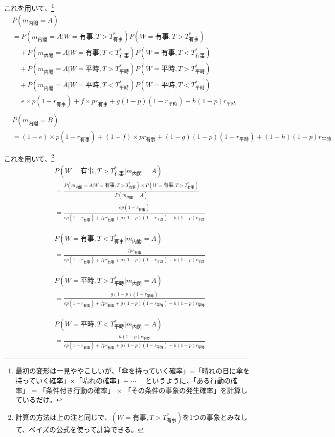 \documentclass[main.tex]{subfiles}
\begin{document}
これを用いて、\footnote{最初の変形は一見ややこしいが、「傘を持っていく確率」=「晴れの日に傘を持っていく確率」×「晴れの確率」+ $\cdots \quad$ 
というように、「ある行動の確率」 = 「条件付き行動の確率」 × 「その条件の事象の発生確率」を計算しているだけ。}
\begin{align*}
    & P(m_{内閣} = A) \\
    &=  P(m_{内閣} = A | W=有事, T>T^*_{有事})P(W=有事, T>T^*_{有事}) \\
    &\quad + P(m_{内閣} = A | W=有事, T<T^*_{有事})P(W=有事, T<T^*_{有事})\\
    &\quad + P(m_{内閣} = A | W=平時, T>T^*_{平時})P(W=平時, T>T^*_{平時})\\
    &\quad + P(m_{内閣} = A | W=平時, T<T^*_{平時})P(W=平時, T<T^*_{平時})\\
    &= e × p(1-r_{有事}) + f× pr_{有事} + g(1-p)(1-r_{平時}) + h(1-p)r_{平時}\\
    \\
    & P(m_{内閣} = B) \\
    &= (1-e) × p(1-r_{有事}) + (1-f)× pr_{有事} + (1-g)(1-p)(1-r_{平時}) + (1-h)(1-p)r_{平時}
\end{align*}

これを用いて、\footnote{計算の方法は上の注と同じで、$(W=有事, T>T^*_{有事})$を1つの事象とみなして、ベイズの公式を使って計算できる。}
\begin{align*}
    & P(W=有事, T>T^*_{有事} | m_{内閣}=A)\\[0.5em]
    &= \frac{ P(m_{内閣}=A| W={有事}, T>T^*_{有事}) × P(W={有事}, T>T^*_{有事}) }{ P(m_{内閣}=A) } \\[1em]
    &= \frac{ ep(1-r_{有事}) }{ ep(1-r_{有事}) + fpr_{有事} + g(1-p)(1-r_{平時}) + h(1-p)r_{平時} }
\end{align*}

\begin{align*}
    & P(W=有事, T<T^*_{有事} | m_{内閣}=A)\\[0.5em]
    &= \frac{ fpr_{有事} }{ ep(1-r_{有事}) + fpr_{有事} + g(1-p)(1-r_{平時}) + h(1-p)r_{平時} }
\end{align*}

\begin{align*}
    & P(W=平時, T>T^*_{平時} | m_{内閣}=A)\\[0.5em]
    &= \frac{ g(1-p)(1-r_{平時}) }{ ep(1-r_{有事}) + fpr_{有事} + g(1-p)(1-r_{平時}) + h(1-p)r_{平時} }
\end{align*}

\begin{align*}
    & P(W=平時, T<T^*_{平時} | m_{内閣}=A)\\[0.5em]
    &= \frac{ h(1-p)r_{平時} }{ ep(1-r_{有事}) + fpr_{有事} + g(1-p)(1-r_{平時}) + h(1-p)r_{平時} }
\end{align*}
\end{document}
